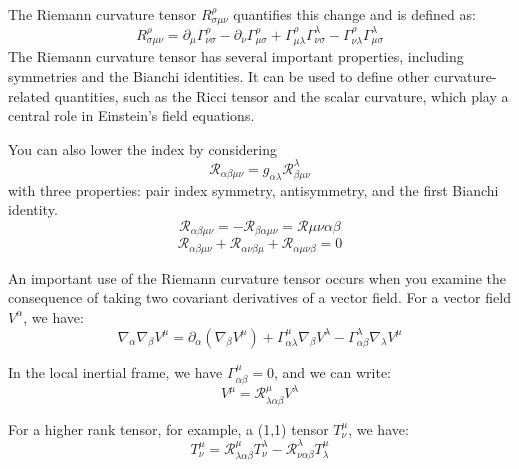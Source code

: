 \documentclass{article}
\newcommand{\Ric}{\mathcal{R}}
\begin{document}
The Riemann curvature tensor $R^\rho_{\sigma\mu\nu}$ quantifies this change and is defined as:
\begin{equation}
R^\rho_{\sigma\mu\nu} = \partial_\mu \Gamma^\rho_{\nu\sigma} - \partial_\nu \Gamma^\rho_{\mu\sigma} + \Gamma^\rho_{\mu\lambda} \Gamma^\lambda_{\nu\sigma} - \Gamma^\rho_{\nu\lambda} \Gamma^\lambda_{\mu\sigma}
\end{equation}
The Riemann curvature tensor has several important properties, including symmetries and the Bianchi identities. It can be used to define other curvature-related quantities, such as the Ricci tensor and the scalar curvature, which play a central role in Einstein's field equations.

You can also lower the index by considering
\begin{equation}
    \Ric_{\alpha\beta\mu\nu}=g_{\alpha\lambda}\Ric^\lambda_{\beta\mu\nu}
\end{equation}
with three properties: pair index symmetry, antisymmetry, and the first Bianchi identity. 
\begin{equation}
    \Ric_{\alpha\beta\mu\nu}=-\Ric_{\beta\alpha\mu\nu}=\Ric{\mu\nu\alpha\beta}
\end{equation}
\begin{equation}
    \Ric_{\alpha\beta\mu\nu}+\Ric_{\alpha\nu\beta\mu}+\Ric_{\alpha\mu\nu\beta}=0
\end{equation}

An important use of the Riemann curvature tensor occurs when you examine the consequence of taking two covariant derivatives of a vector field. For a vector field $V^\alpha$, we have:
\begin{equation}
\nabla_\alpha \nabla_\beta V^\mu  = \partial_\alpha(\nabla_\beta V^\mu) + \Gamma^\mu_{\alpha\lambda} \nabla_\beta V^\lambda - \Gamma^\lambda_{\alpha\beta} \nabla_\lambda V^\mu
\end{equation}

In the local inertial frame, we have $\Gamma^\mu_{\alpha\beta}=0$, and we can write:
\begin{equation}
[\nabla_\alpha,\nabla_\beta]V^\mu= \Ric^\mu_{\lambda\alpha\beta} V^\lambda
\end{equation}

For a higher rank tensor, for example, a (1,1) tensor $T^\mu_\nu$, we have:
\begin{equation}
[\nabla_\alpha,\nabla_\beta]T^\mu_\nu= \Ric^\mu_{\lambda\alpha\beta} T^\lambda_\nu - \Ric^\lambda_{\nu\alpha\beta} T^\mu_\lambda
\end{equation}
\end{document}
